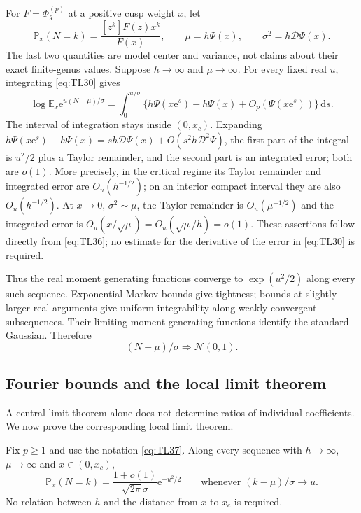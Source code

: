 For \(F=\Phi_g^{(p)}\) at a positive cusp weight \(x\), let \begin{equation}
\mathbb P_x(N=k)=\frac{[z^k]F(z)x^k}{F(x)},\qquad
 \mu=h\Psi(x),\qquad \sigma^2=h\mathscr D\Psi(x).
 \label{eq:TL37}
\end{equation} The last two quantities are model center and variance, not claims
about their exact finite-genus values. Suppose \(h\to\infty\) and
\(\mu\to\infty\). For every fixed real \(u\), integrating \eqref{eq:TL30} gives
\begin{equation}
\log\mathbb E_x \mathrm{e}^{u(N-\mu)/\sigma}
 =\int_0^{u/\sigma}
 \{h\Psi(x\mathrm{e}^s)-h\Psi(x)+O_p(\Psi(x\mathrm{e}^s))\}\,\mathrm{d}s.
 \label{eq:TL38}
\end{equation} The interval of integration stays inside \((0,x_c)\). Expanding
\(h\Psi(x\mathrm e^s)-h\Psi(x)=sh\mathscr D\Psi(x)+O(s^2h\mathscr D^2\Psi)\),
the first part of the integral is \(u^2/2\) plus a Taylor remainder, and the
second part is an integrated error; both are \(o(1)\).
More precisely, in the critical regime its Taylor remainder and
integrated error are \(O_u(h^{-1/2})\); on an interior compact interval
they are also \(O_u(h^{-1/2})\). At \(x\to0\), \(\sigma^2\sim\mu\), the
Taylor remainder is \(O_u(\mu^{-1/2})\) and the integrated error is
\(O_u(x/\sqrt\mu)=O_u(\sqrt\mu/h)=o(1)\). These assertions follow
directly from \eqref{eq:TL36}; no estimate for the derivative of the
error in \eqref{eq:TL30} is required.

Thus the real moment generating functions converge to \(\exp(u^2/2)\)
along every such sequence. Exponential Markov bounds give tightness;
bounds at slightly larger real arguments give uniform integrability
along weakly convergent subsequences. Their limiting moment generating
functions identify the standard Gaussian. Therefore \begin{equation}
(N-\mu)/\sigma\Longrightarrow\mathcal N(0,1).
 \label{eq:TL39}
\end{equation}

\subsection{Fourier bounds and the local limit theorem}\label{uniform-fourier-bounds-and-the-lattice-local-limit}

A central limit theorem alone does not determine ratios of individual
coefficients. We now prove the corresponding local limit theorem.

\begin{proposition}\label{prop:local-limit}
Fix \(p\ge1\) and use the notation \eqref{eq:TL37}. Along every sequence
with \(h\to\infty\), \(\mu\to\infty\) and \(x\in(0,x_c)\),
\begin{equation}
\mathbb P_x(N=k)=\frac{1+o(1)}{\sqrt{2\pi}\sigma}
 \mathrm{e}^{-u^2/2}\qquad\text{whenever }(k-\mu)/\sigma\longrightarrow u.
 \label{eq:TL47}
\end{equation}
No relation between \(h\) and the distance from \(x\) to \(x_c\) is required.
\end{proposition}

